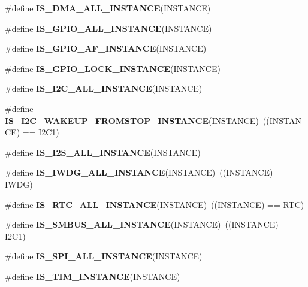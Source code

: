 \begin{DoxyCompactItemize}
\item 
\#define {\bfseries I\+S\+\_\+\+D\+M\+A\+\_\+\+A\+L\+L\+\_\+\+I\+N\+S\+T\+A\+N\+CE}(I\+N\+S\+T\+A\+N\+CE)
\item 
\#define {\bfseries I\+S\+\_\+\+G\+P\+I\+O\+\_\+\+A\+L\+L\+\_\+\+I\+N\+S\+T\+A\+N\+CE}(I\+N\+S\+T\+A\+N\+CE)
\item 
\#define {\bfseries I\+S\+\_\+\+G\+P\+I\+O\+\_\+\+A\+F\+\_\+\+I\+N\+S\+T\+A\+N\+CE}(I\+N\+S\+T\+A\+N\+CE)
\item 
\#define {\bfseries I\+S\+\_\+\+G\+P\+I\+O\+\_\+\+L\+O\+C\+K\+\_\+\+I\+N\+S\+T\+A\+N\+CE}(I\+N\+S\+T\+A\+N\+CE)
\item 
\#define {\bfseries I\+S\+\_\+\+I2\+C\+\_\+\+A\+L\+L\+\_\+\+I\+N\+S\+T\+A\+N\+CE}(I\+N\+S\+T\+A\+N\+CE)
\item 
\mbox{\label{group___exported__macro_gadf692bda16bac3264bccff7f59ddaab9}} 
\#define {\bfseries I\+S\+\_\+\+I2\+C\+\_\+\+W\+A\+K\+E\+U\+P\+\_\+\+F\+R\+O\+M\+S\+T\+O\+P\+\_\+\+I\+N\+S\+T\+A\+N\+CE}(I\+N\+S\+T\+A\+N\+CE)~((I\+N\+S\+T\+A\+N\+CE) == I2\+C1)
\item 
\#define {\bfseries I\+S\+\_\+\+I2\+S\+\_\+\+A\+L\+L\+\_\+\+I\+N\+S\+T\+A\+N\+CE}(I\+N\+S\+T\+A\+N\+CE)
\item 
\mbox{\label{group___exported__macro_gad9ec4c52f0572ee67d043e006f1d5e39}} 
\#define {\bfseries I\+S\+\_\+\+I\+W\+D\+G\+\_\+\+A\+L\+L\+\_\+\+I\+N\+S\+T\+A\+N\+CE}(I\+N\+S\+T\+A\+N\+CE)~((I\+N\+S\+T\+A\+N\+CE) == I\+W\+DG)
\item 
\mbox{\label{group___exported__macro_gab4230e8bd4d88adc4250f041d67375ce}} 
\#define {\bfseries I\+S\+\_\+\+R\+T\+C\+\_\+\+A\+L\+L\+\_\+\+I\+N\+S\+T\+A\+N\+CE}(I\+N\+S\+T\+A\+N\+CE)~((I\+N\+S\+T\+A\+N\+CE) == R\+TC)
\item 
\mbox{\label{group___exported__macro_gaf492fcfe71eab8d1dadf4d837b840af6}} 
\#define {\bfseries I\+S\+\_\+\+S\+M\+B\+U\+S\+\_\+\+A\+L\+L\+\_\+\+I\+N\+S\+T\+A\+N\+CE}(I\+N\+S\+T\+A\+N\+CE)~((I\+N\+S\+T\+A\+N\+CE) == I2\+C1)
\item 
\#define {\bfseries I\+S\+\_\+\+S\+P\+I\+\_\+\+A\+L\+L\+\_\+\+I\+N\+S\+T\+A\+N\+CE}(I\+N\+S\+T\+A\+N\+CE)
\item 
\#define {\bfseries I\+S\+\_\+\+T\+I\+M\+\_\+\+I\+N\+S\+T\+A\+N\+CE}(I\+N\+S\+T\+A\+N\+CE)

\end{DoxyCompactItemize}

